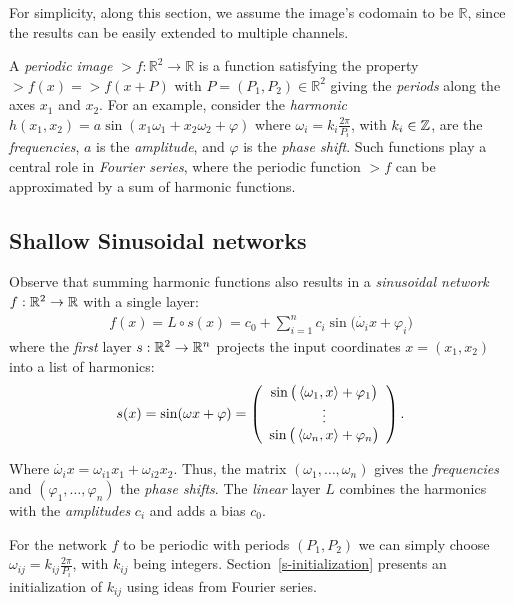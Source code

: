 For simplicity, along this section, we assume the image's codomain to be $\mathbb{R}$, since the results can be easily extended to multiple channels.

A \textit{periodic image} $\gt{f}:\mathbb{R}^2\to \mathbb{R}$ is a function satisfying the property $\gt{f}(x) \!=\! \gt{f}(x + P)$ with $P=(P_1, P_2)\in \mathbb{R}^2$ giving the \textit{periods} along the axes $x_1$ and $x_2$.
For an example, consider the \textit{harmonic} $h(x_1, x_2)=a\sin(x_1\omega_1+x_2\omega_2+ \varphi)$ where $\omega_i\!=\!k_i\frac{2\pi}{P_i}$, with $k_i\in\Z$, are the \textit{frequencies}, $a$ is the \textit{amplitude}, and $\varphi$ is the \textit{phase shift}.
Such functions play a central role in \textit{Fourier series}, where the periodic function $\gt{f}$ can be approximated by a sum of harmonic functions.


\subsection{Shallow Sinusoidal networks}
Observe that summing harmonic functions also results in a \textit{sinusoidal network} $f:\R^2\to \R$ with a single layer:
\begin{align}\label{e-fourier_series}
    f(x) = L\circ s(x) =  c_0 + \sum_{i=1}^{n} c_i  \sin\Big(\dot{\omega_i}{ x}+ \varphi_i\Big)
\end{align}
where the \textit{first} layer $s:\R^2\to \R^{n}$ projects the input coordinates $x=(x_1,x_2)$ into a list of harmonics:
\begin{align}\label{e-firstlayer}
\displaystyle
    s(x)=\sin(\omega x +\varphi)=
    \left(
    \begin{array}{c}
        \sin\big(\dot{\omega_1}{x}+\varphi_1\big)\\
         {\footnotesize\vdots}\\
         \sin\big(\dot{\omega_{n}}{x}+\varphi_{n}\big)
    \end{array}
    \right).
\end{align}

Where $\dot{\omega_i}{x}=\omega_{i1}x_1+\omega_{i2}x_2$. Thus, the matrix $(\omega_1, \ldots, \omega_{n})$ gives the \textit{frequencies} and $(\varphi_1, \ldots, \varphi_{n})$ the \textit{phase shifts}.
The \textit{linear} layer $L$ combines the harmonics with the \textit{amplitudes} $c_i$ and adds a bias $c_0$.

For the network $f$ to be periodic with periods $(P_1,P_2)$ we can simply choose $\omega_{ij}=k_{ij}\frac{2\pi}{P_i}$, with $k_{ij}$ being integers.
Section~\ref{s-initialization} presents an initialization of $k_{ij}$ using ideas from Fourier series.

